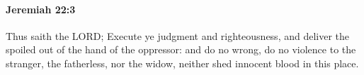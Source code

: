 
		\paragraph{Jeremiah 22:3} %
			\label{JEREMIAH-22-3}

			Thus saith the LORD; Execute ye judgment and righteousness, and deliver the spoiled out of the hand of the oppressor: and do no wrong, do no violence to the stranger, the fatherless, nor the widow, neither shed innocent blood in this place.


